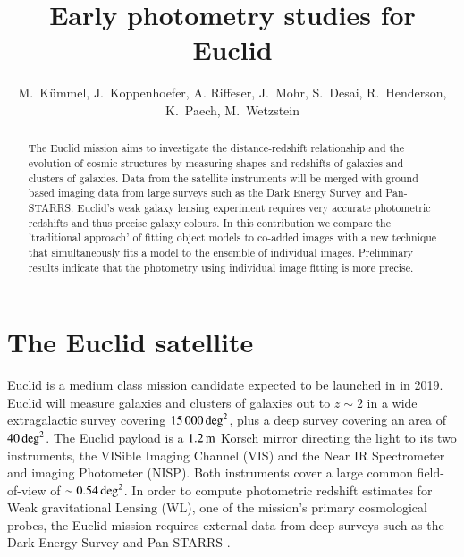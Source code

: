 \documentclass[11pt,twoside]{article}
\begin{document}
\title{Early photometry studies for Euclid}
\author{M.\ K\"ummel, J.\ Koppenhoefer, A. Riffeser, J.\ Mohr,
S.\ Desai, R.\ Henderson, K.\ Paech, M.\ Wetzstein
}

\begin{abstract}
The Euclid mission aims to investigate the distance-redshift
relationship and the evolution of cosmic structures by measuring shapes and
redshifts of galaxies and clusters of galaxies. Data from the satellite
instruments will be merged with ground based imaging data from large
surveys such as the Dark Energy Survey and Pan-STARRS. Euclid's weak galaxy lensing
experiment requires very accurate photometric redshifts and thus precise galaxy colours.
In this contribution
we compare the 'traditional approach' of fitting object models to co-added
images with a new technique that simultaneously fits a model to the ensemble of individual
images. Preliminary results indicate that the photometry using individual
image fitting is more precise.
\end{abstract}

\section{The Euclid satellite}
Euclid \citep{2011arXiv1110.3193L} is a medium class mission candidate expected to be launched in in 2019. 
Euclid will measure galaxies
and clusters of galaxies out to $z\sim2$ in a wide extragalactic survey
covering $15\,000\,\rm{deg}^2$, plus a deep survey covering an area of $40\,\rm{deg}^2$.
The Euclid payload is a $1.2\,\rm{m}$ Korsch mirror directing the light to its two instruments,
the VISible Imaging Channel (VIS) and the Near IR Spectrometer and imaging
Photometer (NISP). Both instruments cover a large common field-of-view of $\sim0.54\,\rm{deg}^2$.
In order to compute photometric redshift estimates for Weak gravitational Lensing (WL),
one of the mission's primary cosmological probes, the Euclid mission requires external data
from deep surveys such as the Dark Energy Survey \citep[DES]{2012APS..APR.D7007F} and
Pan-STARRS \citep{2002SPIE.4836..154K}.
\end{document}
